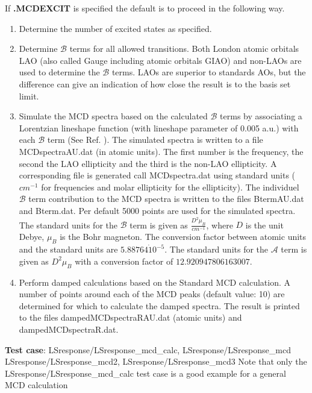 If {\bf .MCDEXCIT} is specified the default is to proceed in the following way. 
\begin{enumerate}
\item Determine the number of excited states as specified. 
\item Determine $\mathcal{B}$ terms for all allowed transitions. Both London atomic orbitals LAO (also called Gauge including atomic orbitals GIAO) and non-LAOs are used to determine the $\mathcal{B}$ terms. LAOs are superior to standards AOs, but the difference can give an indication of how close the result is to the basis set limit. 
\item Simulate the MCD spectra based on the calculated $\mathcal{B}$ terms by associating a Lorentzian lineshape function (with lineshape parameter of 0.005 a.u.) with each $\mathcal{B}$ term (See Ref. \cite{KjaergaardMCD}). 
The simulated spectra is written to a file MCDspectraAU.dat (in atomic units). The first number is the frequency, the second the LAO ellipticity and the third is the non-LAO ellipticity. A corresponding file is generated call MCDspectra.dat using standard units ($cm^{-1}$ for frequencies and molar ellipticity for the ellipticity).
The individuel $\mathcal{B}$ term contribution to the MCD spectra is written to the files BtermAU.dat and Bterm.dat. Per default 5000 points are used for the simulated spectra. 
The standard units for the $\mathcal{B}$ term is given as $\frac{D^{2} \mu_{B}}{cm^{-1}}$, where $D$ is the unit Debye, $\mu_{B}$ is the Bohr magneton. The conversion factor between atomic units and the standard units are $5.88764 \dot 10^{-5}$.
The standard units for the $\mathcal{A}$ term is given as $D^{2} \mu_{B}$ with a conversion factor of $12.920947806163007$.

\item Perform damped calculations based on the Standard MCD calculation. A number of points around each of the MCD peaks (default value: 10) are determined for which to calculate the damped spectra. The result is printed to the files dampedMCDspectraRAU.dat (atomic units) and dampedMCDspectraR.dat.
\end{enumerate}
{\bf Test case}: LSresponse/LSresponse\_mcd\_calc, LSresponse/LSresponse\_mcd\newline
LSresponse/LSresponse\_mcd2, LSresponse/LSresponse\_mcd3  \newline
Note that only the LSresponse/LSresponse\_mcd\_calc test case is a good example for a general MCD calculation

